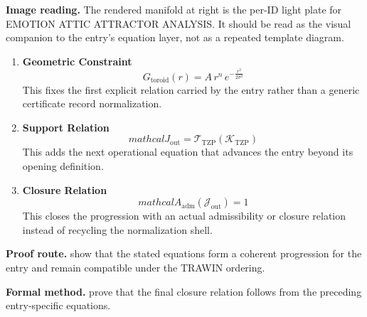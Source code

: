 \begin{samepage}
\noindent\begin{minipage}[t]{0.45\linewidth}
\vspace{0pt}
\raggedright
\scriptsize\textbf{Image reading.} The rendered manifold at right is the per-ID light plate for EMOTION ATTIC ATTRACTOR ANALYSIS. It should be read as the visual companion to the entry's equation layer, not as a repeated template diagram.\par
\end{minipage}\hfill
\begin{minipage}[t]{0.53\linewidth}
\vspace*{-0.10in}
\raggedright
{}
\end{minipage}
\end{samepage}

\clearpage


\begin{enumerate}[leftmargin=1.6em,itemsep=9pt,topsep=6pt]
\item \textbf{Geometric Constraint}
\[
G_\text{toroid}(r) = A \, r^n \, e^{-\frac{r^2}{2\sigma^2}}
\]
This fixes the first explicit relation carried by the entry rather than a generic certificate record normalization.

\item \textbf{Support Relation}
\[
mathcal{J}_{\mathrm{out}} = \mathcal{T}_{\mathrm{TZP}}\!\left(\mathcal{K}_{\mathrm{TZP}}\right)
\]
This adds the next operational equation that advances the entry beyond its opening definition.

\item \textbf{Closure Relation}
\[
mathcal{A}_{\mathrm{adm}}\!\left(\mathcal{J}_{\mathrm{out}}\right)=1
\]
This closes the progression with an actual admissibility or closure relation instead of recycling the normalization shell.
\end{enumerate}

\textbf{Proof route.} show that the stated equations form a coherent progression for the entry and remain compatible under the TRAWIN ordering.

\textbf{Formal method.} prove that the final closure relation follows from the preceding entry-specific equations.

\medskip
{}

